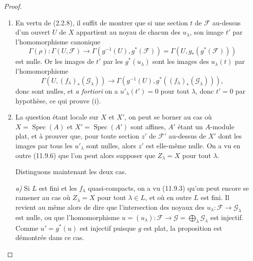 \begin{proof}
\begin{enumerate}[label=(\roman*)]
  \item En vertu de (2.2.8), il suffit de montrer que si une section $t$ de
  $\mathcal F$ au-dessus d'un ouvert $U$ de $X$ appartient au noyau de chacun
  des $u_\lambda$, son image $t'$ par l'homomorphisme canonique
  \[
  \Gamma(\rho):\Gamma(U,\mathcal F)\longrightarrow
  \Gamma(g^{-1}(U),g^*(\mathcal F))
  =\Gamma(U,g_*(g^*(\mathcal F)))
  \]
  est nulle. Or les images de $t'$ par les $g^*(u_\lambda)$ sont les images
  des $u_\lambda(t)$ par l'homomorphisme
  \[
  \Gamma(U,(f_\lambda)_*(\mathcal G_\lambda))\longrightarrow
  \Gamma(g^{-1}(U),g^*((f_\lambda)_*(\mathcal G_\lambda))),
  \]
  donc sont nulles, et \emph{a fortiori} on a $u'_\lambda(t')=0$ pour tout
  $\lambda$, donc $t'=0$ par hypothèse, ce qui prouve (i).

  \item La question étant locale sur $X$ et $X'$, on peut se borner au cas où
  $X=\operatorname{Spec}(A)$ et $X'=\operatorname{Spec}(A')$ sont affines,
  $A'$ étant un $A$-module plat, et à prouver que, pour toute section $z'$ de
  $\mathcal F'$ au-dessus de $X'$ dont les images par tous les $u'_\lambda$
  sont nulles, alors $z'$ est elle-même nulle. On a vu en outre (11.9.6) que
  l'on peut alors supposer que $Z_\lambda=X$ pour tout $\lambda$.

  Distinguons maintenant les deux cas.

  \emph{a)} Si $L$ est fini et les $f_\lambda$ quasi-compacts, on a vu (11.9.3)
  qu'on peut encore se ramener au cas où $Z_\lambda=X$ pour tout
  $\lambda\in L$, et où en outre $L$ est fini. Il revient au même alors de dire
  que l'intersection des noyaux des
  $u_\lambda:\mathcal F\to\mathcal G_\lambda$ est nulle, ou que
  l'homomorphisme
  $u=(u_\lambda):\mathcal F\to\mathcal G=\bigoplus_\lambda\mathcal G_\lambda$
  est injectif. Comme $u'=g^*(u)$ est injectif puisque $g$ est plat, la
  proposition est démontrée dans ce cas.


\end{enumerate}
\end{proof}
